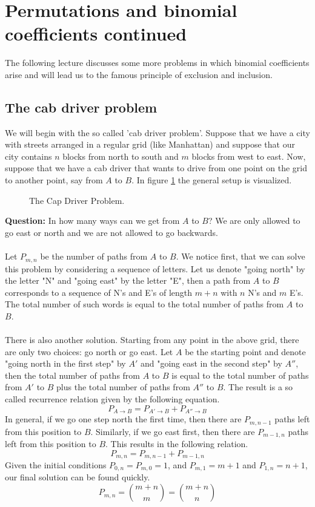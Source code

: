 \section[Permutations, binomial coefficients]{Permutations and binomial coefficients continued}\label{permutationsBinomialCoefficient} 

The following lecture discusses some more problems in which binomial coefficients arise and will lead us 
to the famous principle of exclusion and inclusion.

\subsection{The cab driver problem}

We will begin with the so called 'cab driver problem'. Suppose that we have a city with streets arranged in 
a regular grid (like Manhattan) and suppose that our city contains $n$ blocks from north to south and $m$ blocks
from west to east. Now, suppose that we have a cab driver that wants to drive from one point on the grid to another
point, say from $A$ to $B$. In figure \ref{fig:cabdriverprobleminitialexample} the general setup is visualized.

\begin{figure}[ht]
    \centering
    \caption{The Cap Driver Problem.}
    \label{fig:cabdriverprobleminitialexample}
\end{figure}
\noindent
\textbf{Question:} In how many ways can we get from $A$ to $B$? We are only allowed to go east or north and we are not allowed to go backwards.
\\
\\
Let $P_{m,n}$ be the number of paths from $A$ to $B$. We notice first, that we can solve this problem by considering a sequence of letters. Let 
us denote "going north" by the letter "N" and "going east" by the letter "E", then a path from $A$ to $B$ corresponds to a sequence of N's and E's
of length $m+n$ with $n$ N's and $m$ E's. The total number of such words is equal to the total number of paths from $A$ to $B$.
\\
\\
There is also another solution. Starting from any point in the above grid, there are only two choices: go north or go east. Let $A$ be the starting point
and denote "going north in the first step" by $A'$ and "going east in the second step" by $A''$, then the total number of paths from $A$ to $B$ is equal to 
the total number of paths from $A'$ to $B$ plus the total number of paths from $A''$ to $B$. The result is a so called recurrence relation given by the following equation.
$$
P_{A \to B}=P_{A' \to B} + P_{A'' \to B}
$$
In general, if we go one step north the first time, then there are $P_{m, n-1}$ paths left from this position to $B$. Similarly, if we go east first, then there are $P_{m-1, n}$
paths left from this position to $B$. This results in the following relation.
$$
P_{m, n}=P_{m,n-1}+P_{m-1, n}
$$
Given the initial conditions $P_{0,n}=P_{m,0}=1$, and $P_{m,1}=m+1$ and $P_{1,n}=n+1$, our final solution can be found quickly.
$$
P_{m,n}={m + n \choose m}={m+n \choose n}
$$

